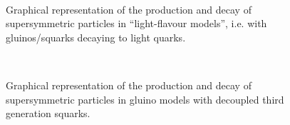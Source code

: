 \begin{figure}[h!]
    \begin{center}
        ~~
        ~~
        \caption{
            Graphical representation of the production and decay of
            supersymmetric particles in ``light-flavour models'', i.e. with
            gluinos/squarks decaying to light quarks.
        }
        \label{fig:simplified-models-feyn-light}
    \end{center}
\end{figure}

\begin{figure}[h!]
    \begin{center}
        ~~
        ~~
        \caption{
            Graphical representation of the production and decay of
            supersymmetric particles in gluino models with decoupled third
            generation squarks.
        }
        \label{fig:simplified-models-feyn-gluino}
    \end{center}
\end{figure}


